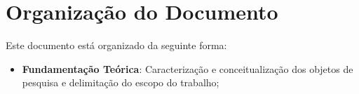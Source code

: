 \section{Organização do Documento}
\label{sec:org}

Este documento está organizado da seguinte forma:

\begin{itemize}
  \item \textbf{Fundamentação Teórica}: Caracterização e conceitualização dos objetos
  de pesquisa e delimitação do escopo do trabalho;

\end{itemize}

